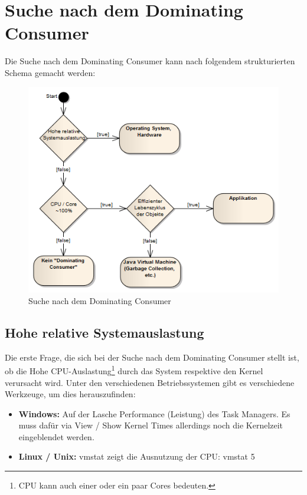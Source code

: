 \section{Suche nach dem Dominating Consumer}\label{dominating_consumer}
Die Suche nach dem Dominating Consumer kann nach folgendem strukturierten Schema gemacht werden:
\begin{figure}[H]
  	\centering
    	\includegraphics[width=13.1cm]{images/dominating_consumer}
        	\caption{Suche nach dem Dominating Consumer}
\end{figure}

\subsection{Hohe relative Systemauslastung}\label{hohe_systemauslastung}
Die erste Frage, die sich bei der Suche nach dem Dominating Consumer stellt ist, ob die Hohe CPU-Auslastung\footnote{CPU kann auch einer oder ein paar Cores bedeuten.} durch das System respektive den Kernel verursacht wird. Unter den verschiedenen Betriebssystemen gibt es verschiedene Werkzeuge, um dies herauszufinden:
\begin{itemize}
	\item \textbf{Windows:} Auf der Lasche Performance (Leistung) des Task Managers. Es muss dafür via View / Show Kernel Times allerdings noch die Kernelzeit eingeblendet werden.
	\item \textbf{Linux / Unix: } vmstat zeigt die Ausnutzung der CPU: vmstat 5
\end{itemize}

